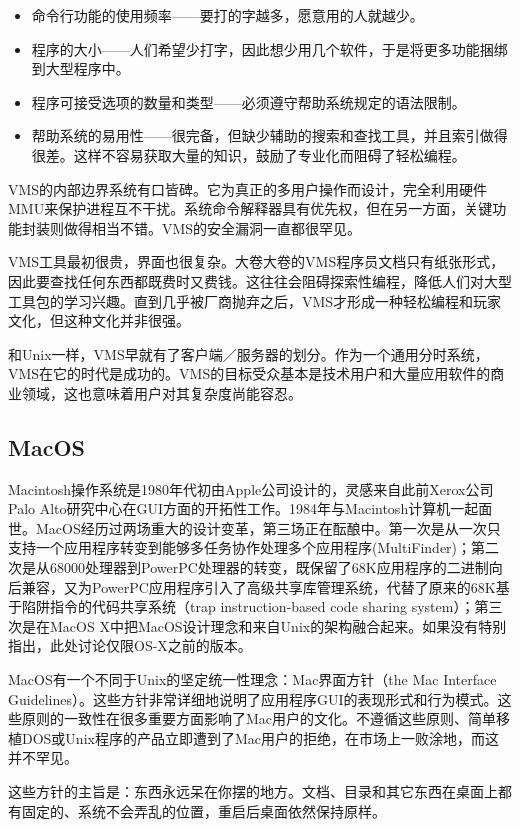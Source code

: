 \documentclass[12pt,oneside]{book}
\begin{document}
\begin{itemize}
\item 命令行功能的使用频率——要打的字越多，愿意用的人就越少。
\item 程序的大小——人们希望少打字，因此想少用几个软件，于是将更多功能捆绑到大型程序中。
\item 程序可接受选项的数量和类型——必须遵守帮助系统规定的语法限制。
\item 帮助系统的易用性——很完备，但缺少辅助的搜索和查找工具，并且索引做得很差。这样不容易获取大量的知识，鼓励了专业化而阻碍了轻松编程。
\end{itemize}

VMS的内部边界系统有口皆碑。它为真正的多用户操作而设计，完全利用硬件MMU来保护进程互不干扰。系统命令解释器具有优先权，但在另一方面，关键功能封装则做得相当不错。VMS的安全漏洞一直都很罕见。

VMS工具最初很贵，界面也很复杂。大卷大卷的VMS程序员文档只有纸张形式，因此要查找任何东西都既费时又费钱。这往往会阻碍探索性编程，降低人们对大型工具包的学习兴趣。直到几乎被厂商抛弃之后，VMS才形成一种轻松编程和玩家文化，但这种文化并非很强。

和Unix一样，VMS早就有了客户端／服务器的划分。作为一个通用分时系统，VMS在它的时代是成功的。VMS的目标受众基本是技术用户和大量应用软件的商业领域，这也意味着用户对其复杂度尚能容忍。


\subsection{MacOS}
Macintosh操作系统是1980年代初由Apple公司设计的，灵感来自此前Xerox公司Palo Alto研究中心在GUI方面的开拓性工作。1984年与Macintosh计算机一起面世。MacOS经历过两场重大的设计变革，第三场正在酝酿中。第一次是从一次只支持一个应用程序转变到能够多任务协作处理多个应用程序(MultiFinder)；第二次是从68000处理器到PowerPC处理器的转变，既保留了68K应用程序的二进制向后兼容，又为PowerPC应用程序引入了高级共享库管理系统，代替了原来的68K基于陷阱指令的代码共享系统（trap instruction-based code sharing system）；第三次是在MacOS X中把MacOS设计理念和来自Unix的架构融合起来。如果没有特别指出，此处讨论仅限OS-X之前的版本。

MacOS有一个不同于Unix的坚定统一性理念：Mac界面方针（the Mac Interface Guidelines）。这些方针非常详细地说明了应用程序GUI的表现形式和行为模式。这些原则的一致性在很多重要方面影响了Mac用户的文化。不遵循这些原则、简单移植DOS或Unix程序的产品立即遭到了Mac用户的拒绝，在市场上一败涂地，而这并不罕见。

这些方针的主旨是：东西永远呆在你摆的地方。文档、目录和其它东西在桌面上都有固定的、系统不会弄乱的位置，重启后桌面依然保持原样。
\end{document}
